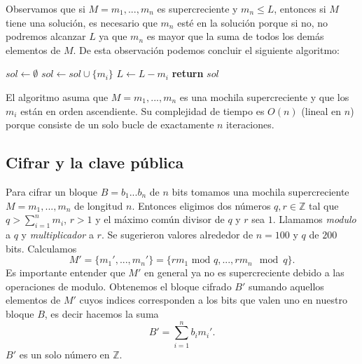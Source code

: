 \documentclass[12pt]{article}
\newcommand{\Z}{\mathbb{Z}}
\begin{document}
Observamos que si $M = m_1, ..., m_n$ es supercreciente y $m_n \leq L$, entonces si $M$ tiene una solución, es necesario que $m_n$ esté en la solución porque si no, no podremos alcanzar $L$ ya que $m_n$ es mayor que la suma de todos los demás elementos de $M$.
De esta observación podemos concluir el siguiente algoritmo:
\vspace{1em}
\begin{algorithmic}[1]
\State $sol \gets \emptyset$
		\State $sol \gets sol \cup \{m_i\}$
		\State $L \gets L - m_i$
	\EndIf
\EndFor
\State \textbf{return} $sol$
\EndProcedure
\end{algorithmic}
\vspace{1em}
El algoritmo asuma que $M = m_1,...,m_n$ es una mochila supercreciente y que los $m_i$ están en orden ascendiente. Su complejidad de tiempo es $O(n)$ (lineal en $n$) porque consiste de un solo bucle de exactamente $n$ iteraciones.

\subsection*{Cifrar y la clave pública}

Para cifrar un bloque $B = b_1...b_n$ de $n$ bits tomamos una mochila supercreciente $M = m_1, ..., m_n$ de longitud $n$. Entonces eligimos dos números $q, r \in \Z$ tal que $q > \sum_{i=1}^nm_i$, $r > 1$ y el máximo común divisor de $q$ y $r$ sea $1$. Llamamos \emph{modulo} a $q$ y \emph{multiplicador} a $r$. Se sugerieron valores alrededor de $n = 100$ y $q$ de $200$ bits. Calculamos
$$M' = \{m_1', ..., m_n'\} = \{r m_1 \text{ mod } q, ..., r m_n \mod q\}.$$
Es importante entender que $M'$ en general ya no es supercreciente debido a las operaciones de modulo. Obtenemos el bloque cifrado $B'$ sumando aquellos elementos de $M'$ cuyos indices corresponden a los bits que valen uno en nuestro bloque $B$, es decir hacemos la suma
$$B' = \sum_{i=1}^nb_im_i'.$$
$B'$ es un solo número en $\Z$.
\end{document}
